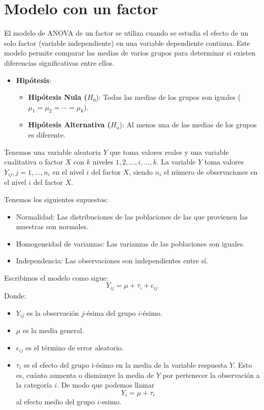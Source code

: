 \documentclass[
  letterpaper,
  DIV=11,
  numbers=noendperiod]{scrreprt}
\providecommand{\tightlist}{%
  \setlength{\itemsep}{0pt}\setlength{\parskip}{0pt}}\usepackage{longtable,booktabs,array}
\begin{document}
\hypertarget{modelo-con-un-factor}{%
\section{Modelo con un factor}\label{modelo-con-un-factor}}

El modelo de ANOVA de un factor se utiliza cuando se estudia el efecto
de un solo factor (variable independiente) en una variable dependiente
continua. Este modelo permite comparar las medias de varios grupos para
determinar si existen diferencias significativas entre ellos.

\begin{itemize}
\tightlist
\item
  \textbf{Hipótesis}:

  \begin{itemize}
  \tightlist
  \item
    \textbf{Hipótesis Nula (}\(H_0\)): Todas las medias de los grupos
    son iguales (\(\mu_1 = \mu_2 = \cdots = \mu_k\)).
  \item
    \textbf{Hipótesis Alternativa (}\(H_a\)): Al menos una de las medias
    de los grupos es diferente.
  \end{itemize}
\end{itemize}

Tenemos una variable aleatoria \(Y\) que toma valores reales y una
variable cualitativa o factor \(X\) con \(k\) niveles
\(1,2,\ldots,i,\ldots,k\). La variable \(Y\) toma valores
\(Y_{ij}, j=1,\ldots,n_i\) en el nivel \(i\) del factor \(X\), siendo
\(n_i\) el número de observaciones en el nivel \(i\) del factor \(X\).

Tenemos los siguientes supuestos:

\begin{itemize}
\tightlist
\item
  Normalidad: Las distribuciones de las poblaciones de las que provienen
  las muestras son normales.
\item
  Homogeneidad de varianzas: Las varianzas de las poblaciones son
  iguales.
\item
  Independencia: Las observaciones son independientes entre sí.
\end{itemize}

Escribimos el modelo como sigue: \[
  Y_{ij} = \mu + \tau_i + \epsilon_{ij}
\] Donde:

\begin{itemize}
\tightlist
\item
  \(Y_{ij}\) es la observación \(j\)-ésima del grupo \(i\)-ésimo.
\item
  \(\mu\) es la media general.
\item
  \(\epsilon_{ij}\) es el término de error aleatorio.
\item
  \(\tau_i\) es el efecto del grupo i-ésimo en la media de la variable
  respuesta \(Y\). Esto es, cuánto aumenta o disminuye la media de \(Y\)
  por pertenecer la observación a la categoría \(i\). De modo que
  podemos llamar \[
  Y_i=\mu+\tau_i
  \] al efecto medio del grupo \(i\)-esimo.
\end{itemize}
\end{document}
